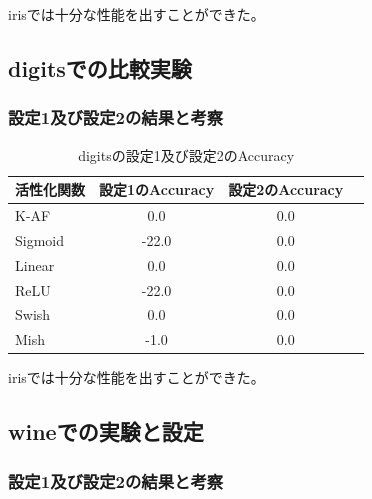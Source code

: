 irisでは十分な性能を出すことができた。


\subsection{digitsでの比較実験}
\label{ev:digitsでの比較実験}


\subsubsection{設定1及び設定2の結果と考察}


\begin{table}[htbp]
    \begin{center}
        \caption{digitsの設定1及び設定2のAccuracy}
        \vspace{2mm} 
        \begin{tabular}{l*{2}{c}r}
            活性化関数              & 設定1のAccuracy &  設定2のAccuracy \\
            \hline
            K-AF            & 0.0 & 0.0 \\
            Sigmoid            & -22.0 & 0.0\\
            Linear            & 0.0 & 0.0\\
            ReLU        & -22.0 & 0.0\\
            Swish           & 0.0 & 0.0 \\
            Mish           & -1.0 & 0.0\\
    
        \end{tabular}
    \end{center}
\end{table}



irisでは十分な性能を出すことができた。



\subsection{wineでの実験と設定}
\label{ev:wineでの実験と設定}

\subsubsection{設定1及び設定2の結果と考察}


